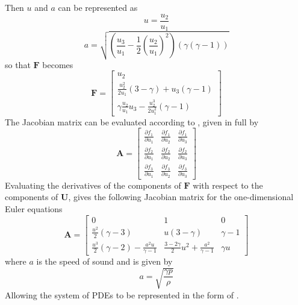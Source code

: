 Then $u$ and $a$ can be represented as
\begin{equation}
	u = \frac{u_2}{u_1}
\end{equation}
\begin{equation}
	a = \sqrt{\left(\frac{u_3}{u_1} - \frac{1}{2} \left(\frac{u_2}{u_1}\right)^2\right)\left(\gamma\left(\gamma - 1\right)\right)}
\end{equation}
so that $\boldsymbol{F}$ becomes
\begin{equation}
	\boldsymbol{F} =
	\begin{bmatrix}
		u_2\\
		\frac{u_2^2}{2 u_1} \left(3 - \gamma\right) + u_3 \left(\gamma - 1\right)\\
		\gamma \frac{u_2}{u_1} u_3 - \frac{u_2^3}{2 u_1^2} \left(\gamma - 1\right)
	\end{bmatrix}
\end{equation}
The Jacobian matrix can be evaluated according to , given in full by
\begin{equation}
	\boldsymbol{A} = 
	\begin{bmatrix}
		\frac{\partial f_1}{\partial u_1} & \frac{\partial f_1}{\partial u_2} & \frac{\partial f_1}{\partial u_3}\\
		\frac{\partial f_2}{\partial u_1} & \frac{\partial f_2}{\partial u_2} & \frac{\partial f_2}{\partial u_3}\\
		\frac{\partial f_3}{\partial u_1} & \frac{\partial f_3}{\partial u_2} & \frac{\partial f_3}{\partial u_3}
	\end{bmatrix}
\end{equation}
Evaluating the derivatives of the components of $\boldsymbol{F}$ with respect to the components of $\boldsymbol{U}$, gives the following Jacobian matrix for the one-dimensional Euler equations
\begin{equation}
	\boldsymbol{A} = 
	\begin{bmatrix}
		0 & 1 & 0\\
		\frac{u^2}{2}\left(\gamma - 3\right)& u(3 - \gamma) & \gamma - 1\\
		\frac{u^3}{2} \left(\gamma - 2\right) - \frac{a^2 u}{\gamma - 1}& \frac{3 - 2 \gamma}{2} u^2 + \frac{a^2}{\gamma - 1}  & \gamma u
	\end{bmatrix}
\end{equation}
where $a$ is the speed of sound and is given by
\begin{equation}
	a = \sqrt{\frac{\gamma p}{\rho}}
\end{equation}
Allowing the system of PDEs to be represented in the form of .

